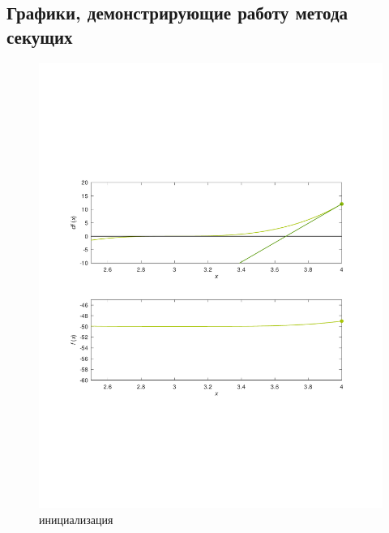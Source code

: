 \documentclass[a4paper,12pt]{article}
\begin{document}
\subsection*{Графики, демонстрирующие работу метода секущих}
    \begin{figure}[H]
        \centering
        \includegraphics[scale=0.4]{0secantitter.pdf}
        \caption{инициализация}
    \end{figure}
\end{document}
